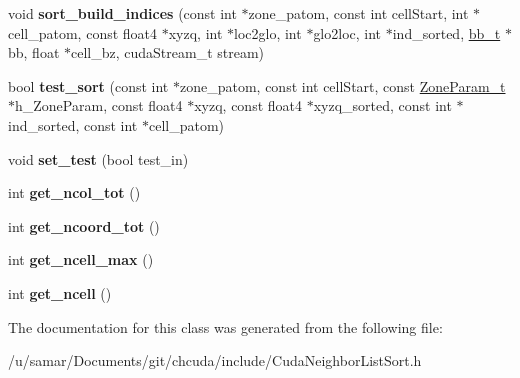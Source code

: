\begin{DoxyCompactItemize}
\item 
\hypertarget{classCudaNeighborListSort_aa89785d0d4ff572855f824aa4303e348}{}\label{classCudaNeighborListSort_aa89785d0d4ff572855f824aa4303e348} 
void {\bfseries sort\+\_\+build\+\_\+indices} (const int $\ast$zone\+\_\+patom, const int cell\+Start, int $\ast$cell\+\_\+patom, const float4 $\ast$xyzq, int $\ast$loc2glo, int $\ast$glo2loc, int $\ast$ind\+\_\+sorted, \hyperlink{structbb__t}{bb\+\_\+t} $\ast$bb, float $\ast$cell\+\_\+bz, cuda\+Stream\+\_\+t stream)
\item 
\hypertarget{classCudaNeighborListSort_a6467189a310c4b615c681eeb89a60854}{}\label{classCudaNeighborListSort_a6467189a310c4b615c681eeb89a60854} 
bool {\bfseries test\+\_\+sort} (const int $\ast$zone\+\_\+patom, const int cell\+Start, const \hyperlink{structZoneParam__t}{Zone\+Param\+\_\+t} $\ast$h\+\_\+\+Zone\+Param, const float4 $\ast$xyzq, const float4 $\ast$xyzq\+\_\+sorted, const int $\ast$ind\+\_\+sorted, const int $\ast$cell\+\_\+patom)
\item 
\hypertarget{classCudaNeighborListSort_a52e7541e7b188f6b8c18c0c28cceb6ce}{}\label{classCudaNeighborListSort_a52e7541e7b188f6b8c18c0c28cceb6ce} 
void {\bfseries set\+\_\+test} (bool test\+\_\+in)
\item 
\hypertarget{classCudaNeighborListSort_add7ef063f53b58cfae333baddc66a4c9}{}\label{classCudaNeighborListSort_add7ef063f53b58cfae333baddc66a4c9} 
int {\bfseries get\+\_\+ncol\+\_\+tot} ()
\item 
\hypertarget{classCudaNeighborListSort_aa0073d05204b40663482d7d4ec51c05c}{}\label{classCudaNeighborListSort_aa0073d05204b40663482d7d4ec51c05c} 
int {\bfseries get\+\_\+ncoord\+\_\+tot} ()
\item 
\hypertarget{classCudaNeighborListSort_a730b915eb141a2496fa88c5ca1289c7d}{}\label{classCudaNeighborListSort_a730b915eb141a2496fa88c5ca1289c7d} 
int {\bfseries get\+\_\+ncell\+\_\+max} ()
\item 
\hypertarget{classCudaNeighborListSort_aa341d6c819cedbe8c4d365441b6d7377}{}\label{classCudaNeighborListSort_aa341d6c819cedbe8c4d365441b6d7377} 
int {\bfseries get\+\_\+ncell} ()
\end{DoxyCompactItemize}


The documentation for this class was generated from the following file\+:\begin{DoxyCompactItemize}
\item 
/u/samar/\+Documents/git/chcuda/include/Cuda\+Neighbor\+List\+Sort.\+h\end{DoxyCompactItemize}
